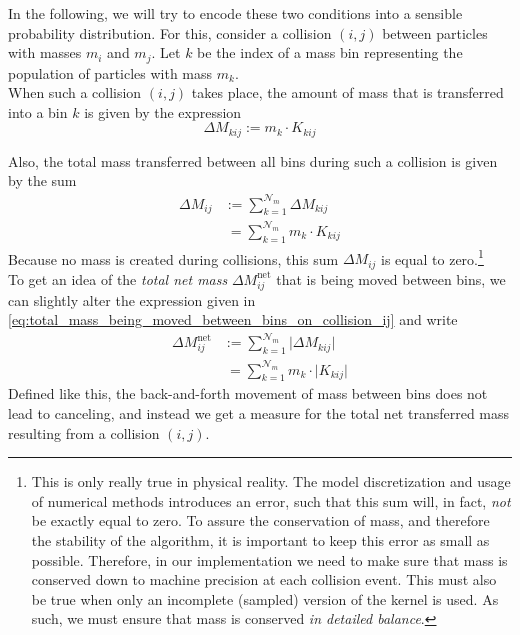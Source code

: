     In the following, we will try to encode these two conditions into a sensible probability 
    distribution. 
    For this, consider a collision $(i, j)$ between particles with masses $m_i$ and $m_j$. 
    Let $k$ be the index of a mass bin representing the population of particles with mass $m_k$. \\

    When such a collision $(i, j)$ takes place, the amount of mass that is transferred into
    a bin $k$ is given by the expression 
    \begin{equation}
      \Delta M_{kij} := m_k \cdot K_{kij}
    \end{equation}

    Also, the total mass transferred between all bins during such a collision is given by the sum 
    \begin{align}
        \label{eq:total_mass_being_moved_between_bins_on_collision_ij}
        \Delta M_{ij} 
        &:= \sum_{k=1}^{\mathcal N_m} \Delta M_{kij} \\
        &\ = \sum_{k=1}^{\mathcal N_m} m_k \cdot K_{kij}
    \end{align}
    Because no mass is created during collisions, this sum $\Delta M_{ij}$ is equal to 
    zero.\footnote{ 
        This is only really true in physical reality.
        The model discretization and usage of numerical methods introduces an error, 
        such that this sum will, in fact, \textit{not} be exactly equal to zero. 
        To assure the conservation of mass, and therefore the stability of the algorithm, it is
        important to keep this error as small as possible. Therefore, in our implementation we need
        to make sure that mass is conserved down to machine precision at each collision event.
        This must also be true when only an incomplete (sampled) version of the kernel is 
        used. As such, we must ensure that mass is conserved \textit{in detailed balance}.
    } \\

    To get an idea of the \textit{total net mass} $\Delta M^\text{net}_{ij}$ 
    that is being moved between bins, we can slightly alter the expression given in 
    \cref{eq:total_mass_being_moved_between_bins_on_collision_ij} and write 
    \begin{align}
        \Delta M^\text{net}_{ij} 
        &:= \sum_{k=1}^{\mathcal N_m} \big| \Delta M_{kij} \big| \\
        &\ = \sum_{k=1}^{\mathcal N_m} m_k \cdot \big| K_{kij} \big|
    \end{align}
    Defined like this, the back-and-forth movement of mass between bins does not lead to canceling, 
    and instead we get a measure for the total net transferred mass resulting from a collision
    $(i, j)$. \\

